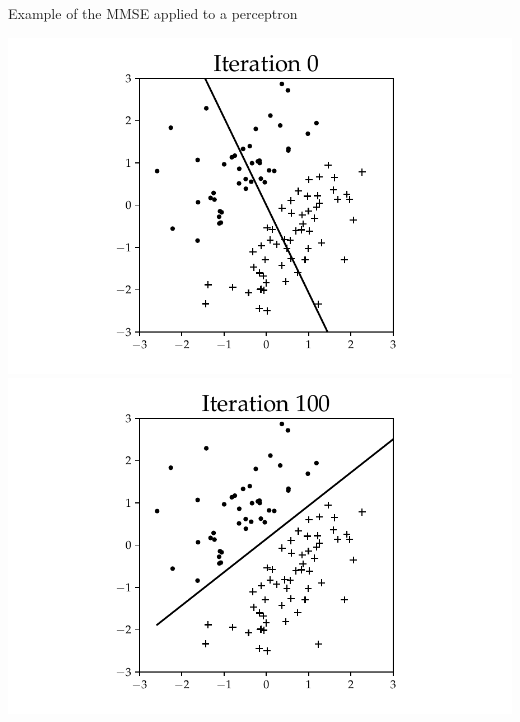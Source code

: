 \documentclass{beamer}
\begin{document}
\begin{frame}{Example of the MMSE applied to a perceptron}
\begin{center}
\includegraphics[scale=0.3]{Module 1 (NN)/pics/figure_0_MMSE_sep.pdf}\includegraphics[scale=0.3]{Module 1 (NN)/pics/figure_100_MMSE_sep.pdf}\\

\end{center}
\end{frame}
\end{document}
